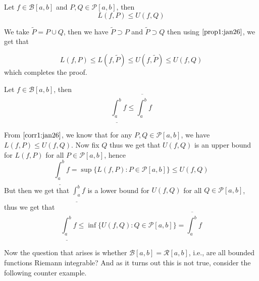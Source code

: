 \begin{corr}\label{corr1:jan26}
    Let $f \in \mathcal{B}[a,b]$ and $P,Q \in \mathcal{P}[a,b]$, then \[ L(f,P) \leq U(f,Q) \] 
\end{corr}
\begin{prf}
    We take $\tilde{P} = P \cup Q$, then we have $ \tilde{P} \supset P $ and $ \tilde{P} \supset Q $ then using  $\ref{prop1:jan26}$, we get that 

    \[ L(f,P) \leq L(f,\tilde{P}) \leq U(f,\tilde{P}) \leq U(f,Q) \]
    which completes the proof.
\end{prf}

\begin{corr}\label{corr2:jan26}
    Let $f \in \mathcal{B}[a,b]$, then 
    \[ \underline{\int_a^b}f \leq \overline{\int_a^b} f \]
\end{corr}
\begin{prf}
    From  $\ref{corr1:jan26}$, we know that for any $P,Q \in \mathcal{P}[a,b]$, we have $L(f,P) \leq U(f,Q)$. Now fix $Q$ thus we get that $U(f,Q)$ is an upper bound for $L(f,P)$ for all $ P \in \mathcal{P}[a,b]$, hence \[ \underline{\int_a^b}f = \sup \{ L(f,P) : P \in \mathcal{P}[a,b] \} \leq U(f,Q) \]
    But then we get that $\displaystyle{\underline{\int_a^b}f}$ is a lower bound for $U(f,Q)$ for all $Q \in \mathcal{P}[a,b]$, thus we get that 
    \[ \underline{\int_a^b}f \leq \inf \{ U(f,Q) : Q \in \mathcal{P}[a,b] \} = \overline{\int_a^b}f \]
\end{prf}

Now the question that arises is whether $\mathcal{B}[a,b] = \mathcal{R}[a,b]$, i.e., are all bounded functions Riemann integrable? And as it turns out this is not true, consider the following counter example.

